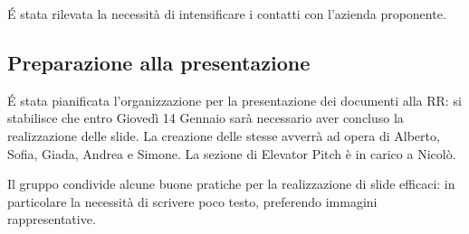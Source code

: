 \'E stata rilevata la necessità di intensificare i contatti con l'azienda proponente.







\subsection{Preparazione alla presentazione}

\'E stata pianificata l'organizzazione per la presentazione dei documenti alla RR: si stabilisce che entro Giovedì 14 Gennaio sarà necessario aver concluso la realizzazione delle slide. La creazione delle stesse avverrà ad opera di Alberto, Sofia, Giada, Andrea e Simone. La sezione di Elevator Pitch è in carico a Nicolò.

Il gruppo condivide alcune buone pratiche per la realizzazione di slide efficaci: in particolare la necessità di scrivere poco testo, preferendo immagini rappresentative.

